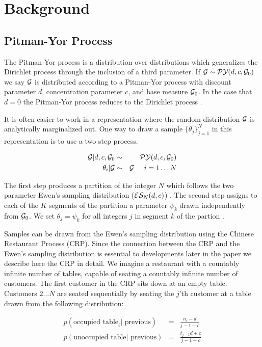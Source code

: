 
\section{Background}
\label{basicModel}

\subsection{Pitman-Yor Process}

The Pitman-Yor process is a distribution over distributions which generalizes the Dirichlet process through the inclusion of a third parameter.  If $\G \sim \PY(d,c,\G_0)$ we say $\G$ is distributed according to a Pitman-Yor process with discount parameter $d$, concentration parameter $c$, and base measure $\G_0$. In the case that $d = 0$ the Pitman-Yor process reduces to the Dirichlet process \cite{Pitman1997}. 

It is often easier to work in a representation where the random distribution $\G$ is analytically marginalized out.  One way to draw a sample $\{ \theta_j \}_{j = 1}^N$ in this representation is to use a two step process.  

\begin{eqnarray*}
\G | d,c,\G_0 &\sim& \PY(d,c,\G_0)\\
\theta_i | \G &\sim& \G  \hspace{.5cm} i = 1 \dots N
\end{eqnarray*}

The first step produces a partition of the integer $N$ which follows the two parameter Ewen's sampling distribution ($\ES_N(d,c)$) \cite{Ewens1995}.  The second step assigns to each of the $K$ segments of the partition a parameter $\psi_k$ drawn independently from $\G_0$.  We set $\theta_j = \psi_k$ for all integers $j$ in segment $k$ of the partion \cite{Blackwell1973}.

Samples can be drawn from the Ewen's sampling distribution using the Chinese Restaurant Process (CRP).  Since the connection between the CRP and the Ewen's sampling distribution is essential to developments later in the paper we describe here the CRP in detail. We imagine a restaurant with a countably infinite number of tables, capable of seating a countably infinite number of customers.  The first customer in the CRP sits down at an empty table.  Customers $2 \dots N$ are seated sequentially by seating the $j$'th customer at a table drawn from the following distribution:

\begin{eqnarray*}
p(\textrm{occupied table}_i |\textrm{ previous}) &=& \frac{n_i - d}{j-1+ c}\\
p(\textrm{unoccupied table} | \textrm{ previous}) &=& \frac{t_{j-1}d +c}{j-1+c}
\end{eqnarray*}

